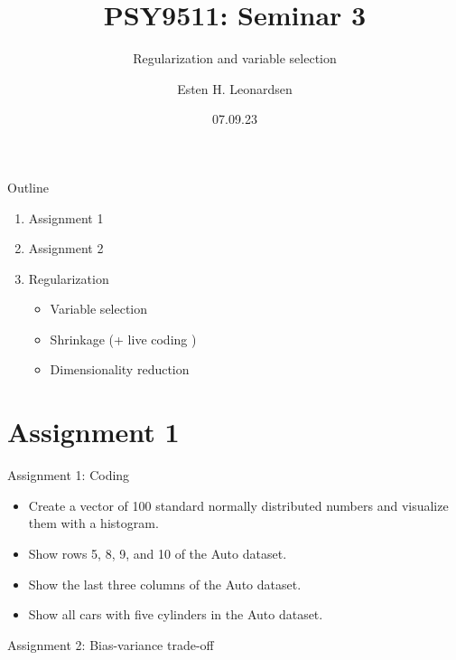 \documentclass[8pt]{beamer}
\title{PSY9511: Seminar 3}
\subtitle{Regularization and variable selection}
\author{Esten H. Leonardsen}
\date{07.09.23}
\begin{document}
	\begin{frame}
	 	\maketitle
	\end{frame}

    \begin{frame}{Outline}
        \centering
        \vfill
        \begin{enumerate}
            \item Assignment 1
            \item Assignment 2
            \item Regularization
            \begin{itemize}
                \item Variable selection
                \item Shrinkage (+ live coding )
                \item Dimensionality reduction
            \end{itemize}
        \end{enumerate}
        \vfill
    \end{frame}

    \section{Assignment 1}

    \begin{frame}[t]{Assignment 1: Coding}
        \vspace{2cm}
        \begin{itemize}
            \item Create a vector of 100 standard normally distributed numbers and visualize them with a histogram.
            \item Show rows 5, 8, 9, and 10 of the Auto dataset.
            \item Show the last three columns of the Auto dataset.
            \item Show all cars with five cylinders in the Auto dataset.
        \end{itemize}

    \end{frame}

    \begin{frame}{Assignment 2: Bias-variance trade-off}
    \end{frame}
\end{document}
